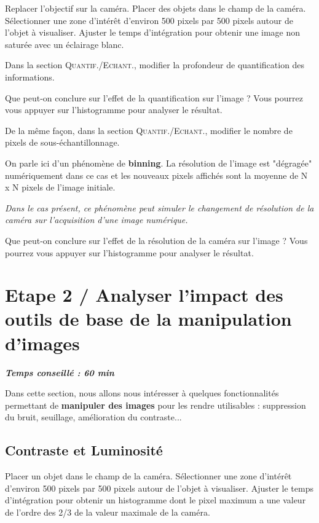 \documentclass[a4paper,11pt,titlepage]{article} %
\begin{document}
\Manip Replacer l'objectif sur la caméra. Placer des objets dans le champ de la caméra. Sélectionner une zone d'intérêt d'environ 500 pixels par 500 pixels autour de l'objet à visualiser. Ajuster le temps d'intégration pour obtenir une image non saturée avec un éclairage blanc. 

\Manip Dans la section \textsc{Quantif./Echant.}, modifier la profondeur de quantification des informations. 

\Quest Que peut-on conclure sur l'effet de la quantification sur l'image ? Vous pourrez vous appuyer sur l'histogramme pour analyser le résultat.

\Manip De la même façon, dans la section \textsc{Quantif./Echant.}, modifier le nombre de pixels de sous-échantillonnage. 

On parle ici d'un phénomène de \textbf{binning}. La résolution de l'image est "dégragée" numériquement dans ce cas et les nouveaux pixels affichés sont la moyenne de N x N pixels de l'image initiale.

\textit{Dans le cas présent, ce phénomène peut simuler le changement de résolution de la caméra sur l'acquisition d'une image numérique.}

\Quest Que peut-on conclure sur l'effet de la résolution de la caméra sur l'image ? Vous pourrez vous appuyer sur l'histogramme pour analyser le résultat.


\newpage
\section{Etape 2 / Analyser l'impact des outils de base de la manipulation d'images}

\begin{center} \textbf{\textit{Temps conseillé : 60 min}} \end{center}

Dans cette section, nous allons nous intéresser à quelques fonctionnalités permettant de \textbf{manipuler des images} pour les rendre utilisables : suppression du bruit, seuillage, amélioration du contraste...

\subsection{Contraste et Luminosité}

\Manip Placer un objet dans le champ de la caméra. Sélectionner une zone d'intérêt d'environ 500 pixels par 500 pixels autour de l'objet à visualiser. Ajuster le temps d'intégration pour obtenir un histogramme dont le pixel maximum a une valeur de l'ordre des 2/3 de la valeur maximale de la caméra. 
\end{document}
